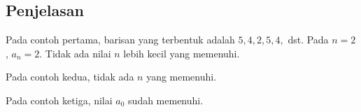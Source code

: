 \documentclass{article}
\begin{document}
\subsection*{Penjelasan}

\par\noindent Pada contoh pertama, barisan yang terbentuk adalah $5, 4, 2, 5, 4,$ dst. Pada $n = 2$, $a_n = 2$. Tidak ada nilai $n$ lebih kecil yang memenuhi.

\par\noindent Pada contoh kedua, tidak ada $n$ yang memenuhi.

\par\noindent Pada contoh ketiga, nilai $a_0$ sudah memenuhi.
\end{document}
